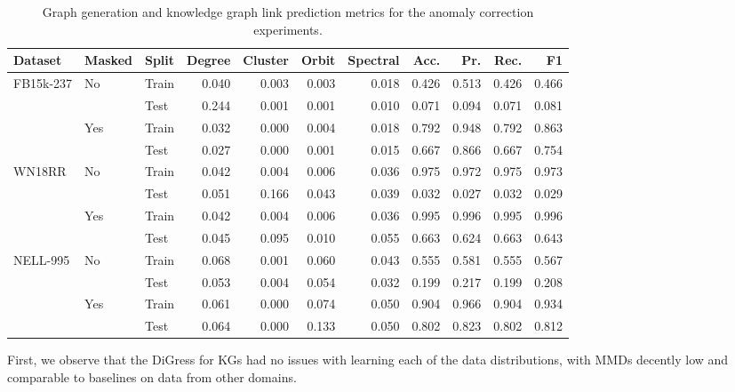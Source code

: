 \begin{table}[H]
    \centering
    \caption{Graph generation and knowledge graph link prediction metrics for the anomaly correction experiments.}
    \label{tab:kg_diffusion_metrics}
    \begin{adjustbox}{width=\textwidth}
    \begin{tabular}{lllrrrrrrrr}
    \toprule
         Dataset & Masked & Split & Degree & Cluster & Orbit & Spectral & Acc. & Pr. & Rec. & F1  \\
    \midrule
         \multirow{4}{*}{FB15k-237} & \multirow{2}{*}{No} & Train & 0.040 & 0.003 & 0.003 & 0.018 & 0.426 & 0.513 & 0.426 & 0.466 \\
         & & Test & 0.244 & 0.001 & 0.001 & 0.010 & 0.071 & 0.094 & 0.071 & 0.081 \\ 
         & \multirow{2}{*}{Yes} & Train & 0.032 & 0.000 & 0.004 & 0.018 & 0.792 & 0.948 & 0.792 & 0.863 \\ 
         & & Test & 0.027 & 0.000 & 0.001 & 0.015 & 0.667 & 0.866 & 0.667 & 0.754 \\ 
         \midrule  
         \multirow{4}{*}{WN18RR} & \multirow{2}{*}{No} & Train & 0.042 & 0.004 & 0.006 & 0.036 & 0.975 & 0.972 & 0.975 & 0.973 \\
         & & Test & 0.051 & 0.166 & 0.043 & 0.039 & 0.032 & 0.027 & 0.032 & 0.029 \\ 
         & \multirow{2}{*}{Yes} & Train & 0.042 & 0.004 & 0.006 & 0.036 & 0.995 & 0.996 & 0.995 & 0.996 \\ 
         & & Test & 0.045 & 0.095 & 0.010 & 0.055 & 0.663 & 0.624 & 0.663 & 0.643 \\ 
         \midrule
         \multirow{4}{*}{NELL-995} & \multirow{2}{*}{No} & Train & 0.068 & 0.001 & 0.060 & 0.043 & 0.555 & 0.581 & 0.555 & 0.567 \\
         & & Test & 0.053 & 0.004 & 0.054 & 0.032 & 0.199 & 0.217 & 0.199 & 0.208 \\ 
         & \multirow{2}{*}{Yes} & Train & 0.061 & 0.000 & 0.074 & 0.050 & 0.904 & 0.966 & 0.904 & 0.934 \\ 
         & & Test & 0.064 & 0.000 & 0.133 & 0.050 & 0.802 & 0.823 & 0.802 & 0.812 \\ 
    \bottomrule
    \end{tabular}
    \end{adjustbox}
\end{table}

First, we observe that the DiGress for KGs had no issues with learning each of the data distributions, with MMDs decently low and comparable to baselines on data from other domains. 

